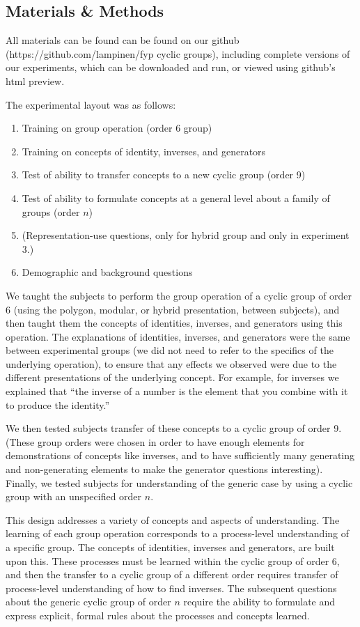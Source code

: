 \documentclass[man,10pt]{apa6}
\begin{document}
\subsection{Materials \& Methods} 
All materials can be found can be found on our github (https://github.com/lampinen/fyp cyclic groups), including complete versions of our experiments, which can be downloaded and run, or viewed using github's html preview. \par
The experimental layout was as follows:
\begin{enumerate}
\item Training on group operation (order 6 group)
\item Training on concepts of identity, inverses, and generators
\item Test of ability to transfer concepts to a new cyclic group (order 9)
\item Test of ability to formulate concepts at a general level about a family of groups (order $n$)
\item (Representation-use questions, only for hybrid group and only in experiment 3.)
\item Demographic and background questions
\end{enumerate}
We taught the subjects to perform the group operation of a cyclic group of order 6 (using the polygon, modular, or hybrid presentation, between subjects), and then taught them the concepts of identities, inverses, and generators using this operation. The explanations of identities, inverses, and generators were the same between experimental groups (we did not need to refer to the specifics of the underlying operation), to ensure that any effects we observed were due to the different presentations of the underlying concept. For example, for inverses we explained that ``the inverse of a number is the element that you combine with it to produce the identity.''\par
We then tested subjects transfer of these concepts to a cyclic group of order 9. (These group orders were chosen in order to have enough elements for demonstrations of concepts like inverses, and to have sufficiently many generating and non-generating elements to make the generator questions interesting). Finally, we tested subjects for understanding of the generic case by using a cyclic group with an unspecified order $n$. \par
This design addresses a variety of concepts and aspects of understanding. The learning of each group operation corresponds to a process-level understanding of a specific group. The concepts of identities, inverses and generators, are built upon this. These processes must be learned within the cyclic group of order 6, and then the transfer to a cyclic group of a different order requires transfer of process-level understanding of how to find inverses. The subsequent questions about the generic cyclic group of order $n$ require the ability to formulate and express explicit, formal rules about the processes and concepts learned. 
\end{document}
